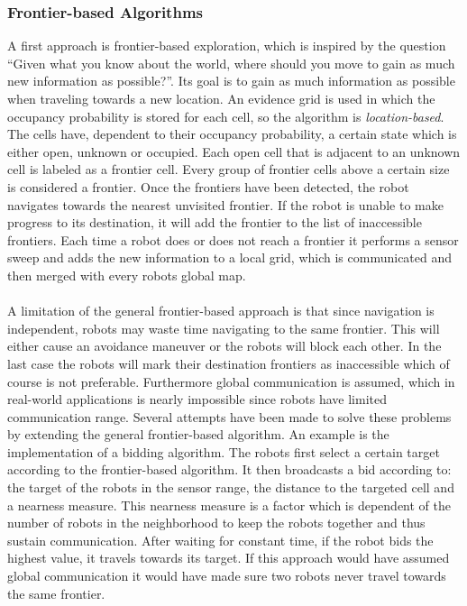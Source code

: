 	\subsubsection{Frontier-based Algorithms}
	A first approach is frontier-based exploration, which is inspired by the question ``Given what you know about the world, where should you move to gain as much new information as possible?''.
	Its goal is to gain as much information as possible when traveling towards a new location.
	An evidence grid is used in which the occupancy probability is stored for each cell, so the algorithm is \emph{location-based}.
	The cells have, dependent to their occupancy probability, a certain state which is either open, unknown or occupied.
	Each open cell that is adjacent to an unknown cell is labeled as a frontier cell.
	Every group of frontier cells above a certain size is considered a frontier.
	Once the frontiers have been detected, the robot navigates towards the nearest unvisited frontier.
	If the robot is unable to make progress to its destination, it will add the frontier to the list of inaccessible frontiers.
	Each time a robot does or does not reach a frontier it performs a sensor sweep and adds the new information to a local grid, which is communicated and then merged with every robots global map. \cite{yamauchi1998frontier}\\
	\\
	A limitation of the general frontier-based approach is that since navigation is independent, robots may waste time navigating to the same frontier.
	This will either cause an avoidance maneuver or the robots will block each other.
	In the last case the robots will mark their destination frontiers as inaccessible which of course is not preferable.
	Furthermore global communication is assumed, which in real-world applications is nearly impossible since robots have limited communication range.
	Several attempts have been made to solve these problems by extending the general frontier-based algorithm.
	An example is the implementation of a bidding algorithm.
	The robots first select a certain target according to the frontier-based algorithm.
	It then broadcasts a bid according to: the target of the robots in the sensor range, the distance to the targeted cell and a nearness measure.
	This nearness measure is a factor which is dependent of the number of robots in the neighborhood to keep the robots together and thus sustain communication.
	After waiting for constant time, if the robot bids the highest value, it travels towards its target.
	If this approach would have assumed global communication it would have made sure two robots never travel towards the same frontier.
